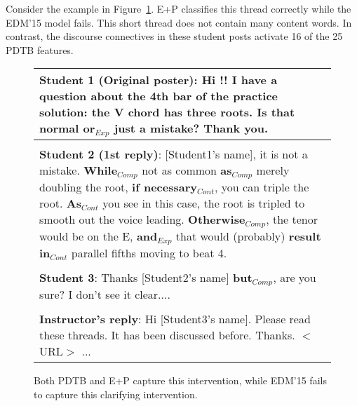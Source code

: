 \documentclass[letterpaper]{article}
\begin{document}
Consider the example in Figure~\ref{fig:example-pdtbEDM}. E+P classifies 
this thread correctly while the EDM'15 model fails. This short thread does not 
contain many content words. In contrast, the discourse connectives in these 
student posts activate 16 of the 25 PDTB features.

\begin{figure}[h]
\small 
\begin{tabular}{|p{7.8cm}|}
\hline 

\textbf{Student 1 (Original poster)}:
Hi !!  I have a question about the 4th bar of the practice solution:
the V chord has three roots. Is that normal \textbf{or}$_{Exp}$ just a mistake?
Thank you. \\

\hline \\

\textbf{Student 2 (1st reply)}:
[Student1's name], it is not a mistake. \textbf{While}$_{Comp}$ not
as common \textbf{as}$_{Comp}$ merely doubling the root,
\textbf{if necessary}$_{Cont}$, you can triple the root. \textbf{As}$_{Cont}$
you see in this case, the root is tripled to smooth out the voice leading.
\textbf{Otherwise}$_{Comp}$, the tenor would be on the E, \textbf{and}$_{Exp}$
that would (probably) \textbf{result in}$_{Cont}$ parallel fifths moving to beat 4. \\

\hline \\

\textbf{Student 3}: Thanks [Student2's name] \textbf{but}$_{Comp}$, are you sure?
I don't see it clear.... \\

\hline \\

\textbf{Instructor's reply}: Hi [Student3's name]. Please read these threads. 
It has been discussed before. 
Thanks. $<$URL$>$ ... \\

\hline
\end{tabular}
\caption{Both PDTB %
and E+P capture this intervention, while EDM'15 fails to capture this 
clarifying intervention.}
\label{fig:example-pdtbEDM}
\end{figure}
\end{document}
